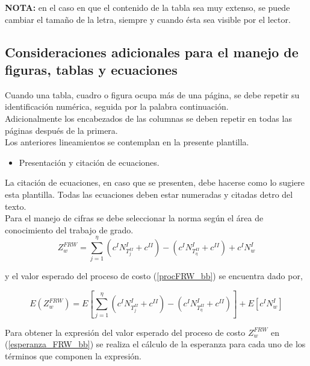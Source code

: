\textbf{NOTA:} en el caso en que el contenido de la tabla sea muy extenso, se puede cambiar el tama\~{n}o de la letra, siempre y cuando \'{e}sta sea visible por el lector.\\

\subsection{Consideraciones adicionales para el manejo de figuras, tablas y ecuaciones}
Cuando una tabla, cuadro o figura ocupa m\'{a}s de una p\'{a}gina, se debe repetir su identificaci\'{o}n num\'{e}rica, seguida por la palabra continuaci\'{o}n.\\

Adicionalmente los encabezados de las columnas se deben repetir en todas las p\'{a}ginas despu\'{e}s de la primera.\\

Los anteriores lineamientos se contemplan en la presente plantilla.\\

\begin{itemize}
\item Presentaci\'{o}n y citaci\'{o}n de ecuaciones.
\end{itemize}

La citaci\'{o}n de ecuaciones, en caso que se presenten, debe hacerse como lo sugiere esta plantilla. Todas las ecuaciones deben estar numeradas y citadas detro del texto.\\

Para el manejo de cifras se debe seleccionar la norma seg\'{u}n el \'{a}rea de conocimiento del trabajo de grado. \\

\begin{equation}\label{procFRW_bb}
Z_{w}^{FRW}= \sum_{j=1}^{\eta} \left( c^{I} N_{T^{II}_{j}}^{I} + c^{II}\right) -\left( c^{I} N_{T^{II}_{\eta}}^{I} + c^{II} \right) + c^{I} N_{w}^{I}
\end{equation}

y el valor esperado del proceso de costo (\ref{procFRW_bb}) se encuentra dado por,

\begin{equation}\label{esperanza_FRW_bb}
E\left( Z_{w}^{FRW}\right) = E\left[ \sum_{j=1}^{\eta} \left(c^{I} N_{T^{II}_{j}}^{I} + c^{II}\right) - \left(c^{I} N_{T^{II}_{\eta}}^{I} + c^{II}\right)    \right]   + E \left[  c^{I} N_{w}^{I}\right] 
\end{equation}

Para obtener la expresi\'{o}n del valor esperado del proceso de costo $Z_{w}^{FRW}$ en (\ref{esperanza_FRW_bb}) se realiza el c\'{a}lculo de la esperanza para cada uno de los t\'{e}rminos que componen la expresi\'{o}n.